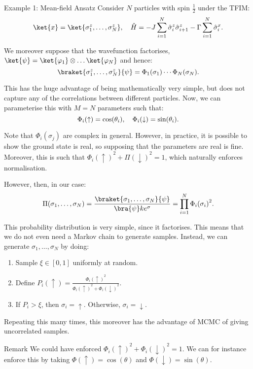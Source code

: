 \documentclass[a4paper]{article}
\begin{document}
\begin{parag}{Example 1: Mean-field Ansatz}
    Consider $N$ particles with spin $\frac{1}{2}$ under the TFIM: 
    \[\ket{x} = \ket{\sigma_1^z, \ldots, \sigma_N^z}, \mathspace \hat{H} = -J \sum_{i=1}^{N} \hat{\sigma}_i^z \hat{\sigma}_{i+1}^z - \Gamma \sum_{i=1}^{N} \hat{\sigma}_i^x.\]

    We moreover suppose that the wavefunction factorises, $\ket{\psi} = \ket{\phi_1} \otimes \ldots \ket{\phi_N}$ and hence:
    \[\braket{\sigma_1^z,\ldots,\sigma_N^z}{\psi} = \Phi_1\left(\sigma_1\right) \cdots \Phi_N\left(\sigma_N\right).\]
    
    This has the huge advantage of being mathematically very simple, but does not capture any of the correlations between different particles. Now, we can parameterise this with $M = N$ parameters such that:
    \[\Phi_i\left(\uparrow\right) = \cos\left(\theta_i\right), \mathspace \Phi_i\left(\downarrow\right) = \sin\left(\theta_i\right).\]

    Note that $\Phi_i\left(\sigma_j\right)$ are complex in general. However, in practice, it is possible to show the ground state is real, so supposing that the parameters are real is fine. Moreover, this is such that $\Phi_i\left(\uparrow\right)^2 + \Pi\left(\downarrow\right)^2 = 1$, which naturally enforces normalisation.

    However, then, in our case:
    \[\Pi\left(\sigma_1, \ldots, \sigma_N\right) = \frac{\braket{\sigma_1, \ldots, \sigma_N}{\psi}}{\bra{\psi}ke^{\sigma}} = \prod_{i=1}^{N} \Phi_i\left(\sigma_i\right)^2.\]

    This probability distribution is very simple, since it factorises. This means that we do not even need a Markov chain to generate samples. Instead, we can generate $\sigma_1, \ldots, \sigma_N$ by doing:
    \begin{enumerate}
        \item Sample $\xi \in \left[0, 1\right]$ uniformly at random.
        \item Define $P_i\left(\uparrow\right) = \frac{\Phi_i\left(\uparrow\right)^2}{\Phi_i\left(\uparrow\right)^2 + \Phi_i\left(\downarrow\right)^2}$.
        \item If $P_i > \xi$, then $\sigma_i = \uparrow$. Otherwise, $\sigma_i = \downarrow$.
    \end{enumerate}

    Repeating this many times, this moreover has the advantage of MCMC of giving uncorrelated samples.

    \begin{subparag}{Remark}
         We could have enforced $\Phi_i\left(\uparrow\right)^2 + \Phi_i\left(\downarrow\right)^2 = 1$. We can for instance enforce this by taking $\Phi\left(\uparrow\right) = \cos\left(\theta\right)$ and $\Phi\left(\downarrow\right) = \sin\left(\theta\right)$.
    \end{subparag}
\end{parag}
\end{document}
